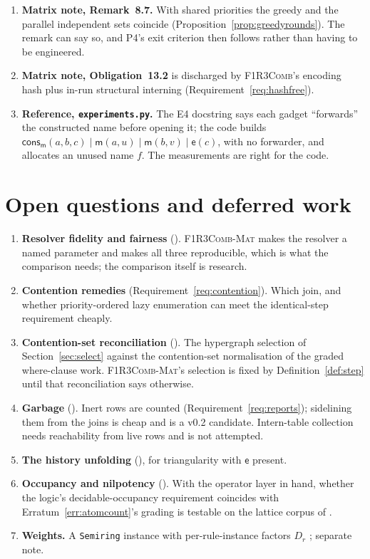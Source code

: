 \documentclass[11pt,a4paper]{article}
\newcommand{\code}[1]{\texttt{#1}}
\newcommand{\Comb}{\textsc{F1R3Comb}}
\newcommand{\Mat}{\textsc{F1R3Comb-Mat}}
\newcommand{\mm}{\mathsf{m}}
\newcommand{\ev}{\mathsf{e}}
\newcommand{\consm}{\mathsf{cons}_{\mm}}
\theoremstyle{definition}
\theoremstyle{plain}
\begin{document}
\begin{enumerate}[leftmargin=1.8em]
\item \textbf{Matrix note, Remark~8.7.} With shared priorities the greedy and
the parallel independent sets coincide (Proposition~\ref{prop:greedyrounds}).
The remark can say so, and P4's exit criterion then follows rather than
having to be engineered.

\item \textbf{Matrix note, Obligation~13.2} is discharged by \Comb's
encoding hash plus in-run structural interning
(Requirement~\ref{req:hashfree}).

\item \textbf{Reference, \code{experiments.py}.} The E4 docstring says each
gadget ``forwards'' the constructed name before opening it; the code builds
$\consm(a,b,c) \mid \mm(a,u) \mid \mm(b,v) \mid \ev(c)$, with no forwarder, and
allocates an unused name $f$. The measurements are right for the code.

\end{enumerate}

\section{Open questions and deferred work}

\begin{enumerate}[leftmargin=1.8em]
\item \textbf{Resolver fidelity and fairness}
(\cite[Obl.~13.1, Obl.~13.6]{matnote}). \Mat{} makes the resolver a named
parameter and makes all three reproducible, which is what the comparison
needs; the comparison itself is research.
\item \textbf{Contention remedies} (Requirement~\ref{req:contention}). Which
join, and whether priority-ordered lazy enumeration can meet the
identical-step requirement cheaply.
\item \textbf{Contention-set reconciliation} (\cite[Obl.~13.4]{matnote}). The
hypergraph selection of Section~\ref{sec:select} against the contention-set
normalisation of the graded where-clause work. \Mat{}'s selection is fixed by
Definition~\ref{def:step} until that reconciliation says otherwise.
\item \textbf{Garbage} (\cite[Obl.~13.3]{matnote}). Inert rows are counted
(Requirement~\ref{req:reports}); sidelining them from the joins is cheap and
is a v0.2 candidate. Intern-table collection needs reachability from live
rows and is not attempted.
\item \textbf{The history unfolding} (\cite[\S6.1, route (1)]{matnote}), for
triangularity with $\ev$ present.
\item \textbf{Occupancy and nilpotency} (\cite[Obl.~13.5]{matnote}). With the
operator layer in hand, whether the logic's decidable-occupancy requirement
coincides with Erratum~\ref{err:atomcount}'s grading is testable on the
lattice corpus of \cite[Req.~9.3]{combspec}.
\item \textbf{Weights.} A \code{Semiring} instance with per-rule-instance
factors $D_{r}$ \cite[\S12]{matnote}; separate note.
\end{enumerate}
\end{document}
